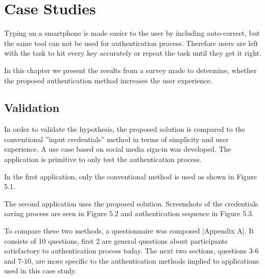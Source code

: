 
\chapter{Case Studies} %


Typing on a smartphone is made easier to the user by including auto-correct, but the same tool can not be used for authentication process. Therefore users are left with the task to hit every key accurately or repeat the task until they get it right. 

In this chapter we present the results from a survey made to determine, whether the proposed authentication method increases the user experience.



\ifpdf
    \graphicspath{{X/figures/PNG/}{X/figures/PDF/}{X/figures/}}
\else
    \graphicspath{{X/figures/EPS/}{X/figures/}}
\fi


%	
%

\section{Validation}
In order to validate the hypothesis, the proposed solution is compared to the conventional ''input credentials'' method in terms of simplicity and user experience. A use case based on social media sign-in was developed. The application is primitive to only test the authentication process. 
	
In the first application, only the conventional method is used as shown in Figure 5.1.

The second application uses the proposed solution. Screenshots of the credentials saving process are seen in Figure 5.2 and authentication sequence in Figure 5.3.

To compare these two methods, a questionnaire was composed |Appendix A|. It consists of 10 questions, first 2 are general questions about participants satisfactory to authentication process today. The next two sections, questions 3-6 and 7-10, are more specific to the authentication methods implied to applications used in this case study. 


